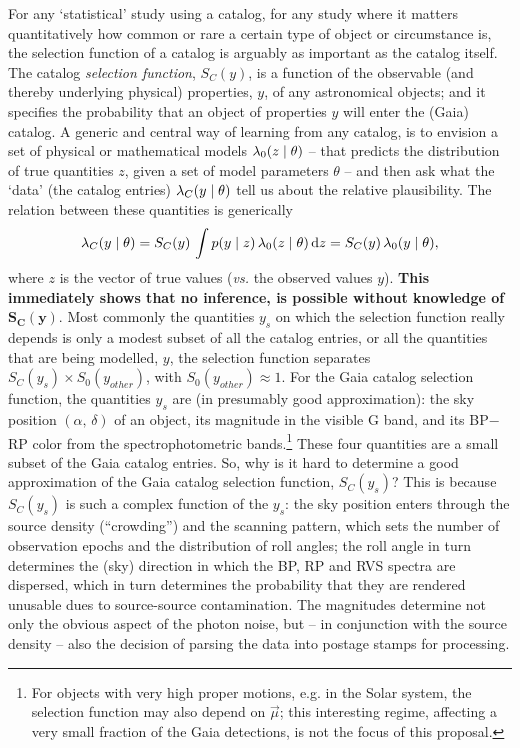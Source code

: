 For any `statistical' study using a catalog, for any study where it matters quantitatively how common or rare a certain type of object or circumstance is, the selection function of a catalog is arguably as important as the catalog itself. The catalog \textit{selection function}, $S_C(y)$, is a function of the observable (and thereby underlying physical) properties, $y$, of any astronomical objects; and it specifies the probability that an object of properties $y$ will enter the (Gaia) catalog. A generic and central way of learning from any catalog, is to envision a set of physical or mathematical models $\lambda_0(z\mid\theta)$ -- that predicts the
distribution of true quantities $z$, given a set of model parameters $\theta$ -- and then ask
what the `data' (the catalog entries) $\lambda_C(y\mid\theta)$ tell us about the relative plausibility. 
The relation between these quantities is generically
\begin{equation}
\lambda_C(y\mid\theta) = S_C(y)\,\int p(y\mid z)\,\lambda_0(z\mid\theta)\,{\textrm{d}} z = S_C(y)\,\lambda_0(y\mid\theta),
\label{eqn:selfunc_definition}
\end{equation}
where $z$ is the vector of true values (\emph{vs.} the observed values $y$). 
\textbf{This immediately shows that no inference, is possible without knowledge of $\mathbf{S_C(y)}$}. Most commonly the quantities $y_s$ on which the selection function really depends is only a modest subset of all the catalog entries, or all the quantities that are being modelled, $y$, the selection function separates $S_C(y_s) \times S_0(y_{other})$, with $S_0(y_{other})\approx 1$. 
For the Gaia catalog selection function, the quantities $y_s$ are (in presumably good approximation): the sky position $(\alpha,\,\delta)$ of an object, its magnitude in the visible G band, and its BP$-$RP color from the spectrophotometric bands.\footnote{For objects with very high proper motions, e.g. in the Solar system, the selection function may also depend on $\vec{\mu}$; this interesting regime, affecting a very small fraction of the Gaia detections, is not the focus of this proposal.} These four quantities are a small subset of the Gaia catalog entries. So, why is it hard to determine a good approximation of the Gaia catalog selection function, $S_C(y_s)$? This is because 
$S_C(y_s)$ is such a complex function of the $y_s$: the sky position enters through the source density (``crowding'') and the scanning pattern, which sets the number of observation epochs and the distribution of roll angles; the roll angle in turn determines the (sky) direction in which the BP, RP and RVS spectra are dispersed, which in turn determines the probability that they are rendered unusable dues to source-source contamination. The magnitudes determine not only the obvious aspect of the photon noise, but -- in conjunction with the source density -- also the decision of parsing the data into postage stamps for processing.


